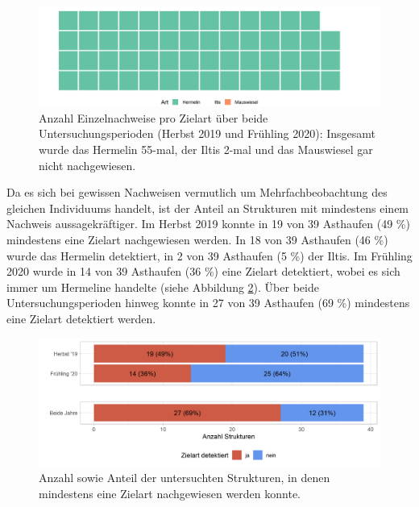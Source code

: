 \documentclass[
  oneside]{scrbook}
\begin{document}
\begin{figure}
\includegraphics[width=1\linewidth]{images/wirkungskontrolle_systematisch_einzelnachweise_waffle} \caption{Anzahl Einzelnachweise pro Zielart über beide Untersuchungsperioden (Herbst 2019 und Frühling 2020): Insgesamt wurde das Hermelin 55-mal, der Iltis 2-mal und das Mauswiesel gar nicht nachgewiesen.}\label{fig:wirkungskontrollesystematischeinzelnachweisewaffle}
\end{figure}

Da es sich bei gewissen Nachweisen vermutlich um Mehrfachbeobachtung des gleichen Individuums handelt, ist der Anteil an Strukturen mit mindestens einem Nachweis aussagekräftiger. Im Herbst 2019 konnte in 19 von 39 Asthaufen (49 \%) mindestens eine Zielart nachgewiesen werden. In 18 von 39 Asthaufen (46 \%) wurde das Hermelin detektiert, in 2 von 39 Asthaufen (5 \%) der Iltis. Im Frühling 2020 wurde in 14 von 39 Asthaufen (36 \%) eine Zielart detektiert, wobei es sich immer um Hermeline handelte (siehe Abbildung \ref{fig:strukturenmitzielart}). Über beide Untersuchungsperioden hinweg konnte in 27 von 39 Asthaufen (69 \%) mindestens eine Zielart detektiert werden.



\begin{figure}
\includegraphics[width=1\linewidth]{images/strukturen_mit_zielart} \caption{Anzahl sowie Anteil der untersuchten Strukturen, in denen mindestens eine Zielart nachgewiesen werden konnte.}\label{fig:strukturenmitzielart}
\end{figure}
\end{document}
